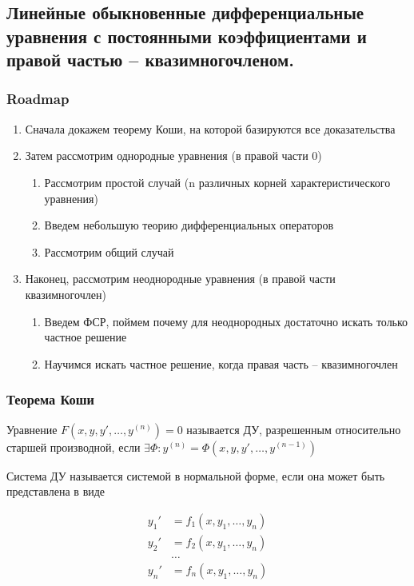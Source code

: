 \subsection{Линейные обыкновенные дифференциальные уравнения с постоянными коэффициентами и правой частью – квазимногочленом.}

\subsubsection{Roadmap}

\begin{enumerate}
    \item Сначала докажем теорему Коши, на которой базируются все доказательства
    \item Затем рассмотрим однородные уравнения (в правой части 0)
    \begin{enumerate}
        \item Рассмотрим простой случай (n различных корней характеристического уравнения)
        \item Введем небольшую теорию дифференциальных операторов
        \item Рассмотрим общий случай
    \end{enumerate}
    \item Наконец, рассмотрим неоднородные уравнения (в правой части квазимногочлен)
    \begin{enumerate}
        \item Введем ФСР, поймем почему для неоднородных достаточно искать только частное решение
        \item Научимся искать частное решение, когда правая часть -- квазимногочлен
    \end{enumerate}
\end{enumerate}

\subsubsection{Теорема Коши}

\Def Уравнение $F(x, y, y', \dots, y^{(n)}) = 0$ называется ДУ, разрешенным относительно старшей производной, если $\exists \Phi: y^{(n)} = \Phi(x, y, y', \dots, y^{(n-1)})$

\Def Система ДУ называется системой в нормальной форме, если она может быть представлена в виде

\begin{align*}
    y_1'&= f_1(x, y_1, \dots, y_n) \\
    y_2'&= f_2(x, y_1, \dots, y_n) \\
    &\dots \\
    y_n'&= f_n(x, y_1, \dots, y_n)
\end{align*}

